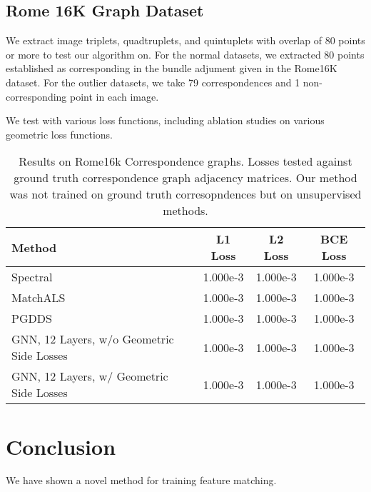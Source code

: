 \documentclass[10pt,twocolumn,letterpaper]{article}
\begin{document}
\subsection{Rome 16K Graph Dataset}
We extract image triplets, quadtruplets, and quintuplets with overlap of 80 points or more to test our algorithm on. For the normal datasets, we extracted 80 points established as corresponding in the bundle adjument given in the Rome16K dataset. For the outlier datasets, we take 79 correspondences and 1 non-corresponding point in each image.

We test with various loss functions, including ablation studies on various geometric loss functions.

\begin{table*}
\begin{center}
\begin{tabular}{|l|c|c|c|}
\hline
Method & L1 Loss & L2 Loss & BCE Loss \\
\hline\hline\hline
Spectral                                  & 1.000e-3 & 1.000e-3 & 1.000e-3 \\ \hline
MatchALS                                  & 1.000e-3 & 1.000e-3 & 1.000e-3 \\ \hline
PGDDS                                     & 1.000e-3 & 1.000e-3 & 1.000e-3 \\ \hline
GNN, 12 Layers, w/o Geometric Side Losses & 1.000e-3 & 1.000e-3 & 1.000e-3 \\ \hline
GNN, 12 Layers, w/ Geometric Side Losses  & 1.000e-3 & 1.000e-3 & 1.000e-3 \\ \hline

\hline
\end{tabular}
\end{center}
\caption{
Results on Rome16k Correspondence graphs.
Losses tested against ground truth correspondence graph adjacency matrices.
Our method was not trained on ground truth corresopndences but on unsupervised methods.
}
\end{table*}


\section{Conclusion}

We have shown a novel method for training feature matching. 

{\small


}
\end{document}
